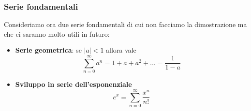 \subsubsection{Serie fondamentali}
Consideriamo ora due serie fondamentali di cui non facciamo la dimostrazione ma che ci saranno
molto utili in futuro:
\begin{itemize}
	\item \textbf{Serie geometrica}: se $|a| < 1$ allora vale
	      \[ \sum_{n=0}^\infty a^n = 1 + a + a^2 + \dots = \frac{1}{1 - a} \]
	\item \textbf{Sviluppo in serie dell'esponenziale}
	      \[ e^x = \sum_{n=0}^\infty \frac{x^n}{n!} \]
\end{itemize}
